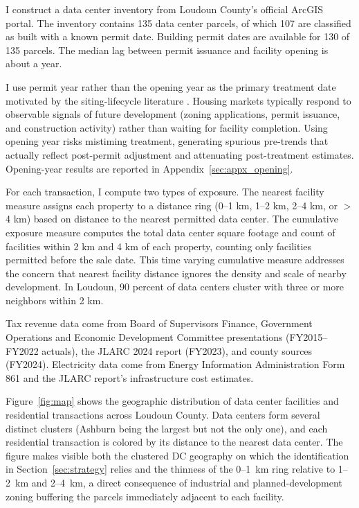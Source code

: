\documentclass[12pt]{article}
\begin{document}
I construct a data center inventory from Loudoun County's official ArcGIS portal. The inventory contains 135 data center parcels, of which 107 are classified as built with a known permit date. Building permit dates are available for 130 of 135 parcels. The median lag between permit issuance and facility opening is about a year.

I use permit year rather than the opening year as the primary treatment date motivated by the siting-lifecycle literature \citep{KielMcClain1995, Dehring2007}. Housing markets typically respond to observable signals of future development (zoning applications, permit issuance, and construction activity) rather than waiting for facility completion. Using opening year risks mistiming treatment, generating spurious pre-trends that actually reflect post-permit adjustment and attenuating post-treatment estimates. Opening-year results are reported in Appendix~\ref{sec:appx_opening}.

For each transaction, I compute two types of exposure. The nearest facility measure assigns each property to a distance ring (0--1 km, 1--2 km, 2--4 km, or $>$4 km) based on distance to the nearest permitted data center. The cumulative exposure measure computes the total data center square footage and count of facilities within 2 km and 4 km of each property, counting only facilities permitted before the sale date. This time varying cumulative measure addresses the concern that nearest facility distance ignores the density and scale of nearby development. In Loudoun, 90 percent of data centers cluster with three or more neighbors within 2 km.

Tax revenue data come from Board of Supervisors Finance, Government Operations and Economic Development Committee presentations (FY2015--FY2022 actuals), the JLARC 2024 report (FY2023), and county sources (FY2024). Electricity data come from Energy Information Administration Form 861 and the JLARC report's infrastructure cost estimates.

Figure~\ref{fig:map} shows the geographic distribution of data center facilities and residential transactions across Loudoun County. Data centers form several distinct clusters (Ashburn being the largest but not the only one), and each residential transaction is colored by its distance to the nearest data center. The figure makes visible both the clustered DC geography on which the identification in Section~\ref{sec:strategy} relies and the thinness of the 0--1~km ring relative to 1--2~km and 2--4~km, a direct consequence of industrial and planned-development zoning buffering the parcels immediately adjacent to each facility.
\end{document}
